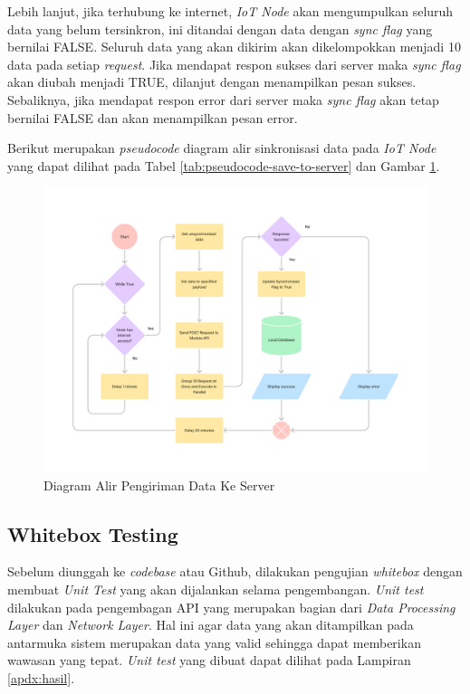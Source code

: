 Lebih lanjut, jika terhubung ke internet, \textit{IoT Node} akan mengumpulkan seluruh data yang belum tersinkron, ini ditandai dengan data dengan \textit{sync flag} yang bernilai FALSE. Seluruh data yang akan dikirim akan dikelompokkan menjadi 10 data pada setiap \textit{request}. Jika mendapat respon sukses dari server maka \textit{sync flag} akan diubah menjadi TRUE, dilanjut dengan menampilkan pesan sukses. Sebaliknya, jika mendapat respon error dari server maka \textit{sync flag} akan tetap bernilai FALSE dan akan menampilkan pesan error.

Berikut merupakan \textit{pseudocode} diagram alir sinkronisasi data pada \textit{IoT Node} yang dapat dilihat pada Tabel \ref{tab:pseudocode-save-to-server} dan Gambar \ref{fig:flow-upload}.


\begin{figure}[!h]
    \includegraphics[width=1.2\linewidth, center]{images/flowcharts/flow-save-to-server.png}
    \caption{Diagram Alir Pengiriman Data Ke Server}
    \label{fig:flow-upload}
\end{figure}

\newpage

\subsection{Whitebox Testing}

Sebelum diunggah ke \textit{codebase} atau Github, dilakukan pengujian \textit{whitebox} dengan membuat \textit{Unit Test} yang akan dijalankan selama pengembangan. \textit{Unit test} dilakukan pada pengembagan API yang merupakan bagian dari \textit{Data Processing Layer} dan \textit{Network Layer}. Hal ini agar data yang akan ditampilkan pada antarmuka sistem merupakan data yang valid sehingga dapat memberikan wawasan yang tepat. \textit{Unit test} yang dibuat dapat dilihat pada Lampiran \ref{apdx:hasil}.

